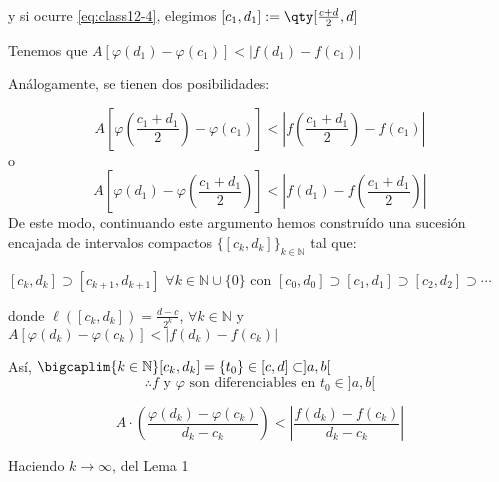 {y si ocurre \eqref{eq:class12-4}, elegimos $[c_1,d_1]:=\qty[\frac{c+d}{2},d]$

Tenemos que $A[\varphi(d_1)- \varphi(c_1)] < |f(d_1)-f(c_1)|$

Análogamente, se tienen dos posibilidades:

\begin{equation}
	A[\varphi(\frac{c_1+d_1}{2})-\varphi(c_1)] < |f(\frac{c_1+d_1}{2})-f(c_1)| 
		\label{eq:class12-5}
	\end{equation}
o
\begin{equation}
	A[\varphi(d_1)-\varphi(\frac{c_1+d_1}{2})] < |f(d_1)-f(\frac{c_1+d_1}{2})|
	\label{eq:class12-6}
\end{equation}
De este modo, continuando este argumento hemos construído una sucesión encajada de intervalos compactos
$\{[c_k,d_k]\}_{k\in\mathbb{N}}$ tal que:

$[c_k,d_k]\supset[c_{k+1},d_{k+1}]$ $\forall k\in\mathbb{N}\cup \{0\}$ con
$[c_0,d_0]\supset[c_1,d_1]\supset[c_2,d_2]\supset\cdots$ 

donde $\ell([c_k,d_k])=\frac{d-c}{2^k}$, $\forall k\in\mathbb{N}$
y $A[\varphi(d_k)-\varphi(c_k)]<|f(d_k)-f(c_k)|$

Así, $\bigcaplim{k\in\mathbb{N}}[c_k,d_k]=\{t_0\}\in[c,d] \subset ]a, b[$
$$
\therefore f \text{ y } \varphi \text{ son diferenciables en }   t_0\in]a,b[
$$

}


 
 
	
	

	
	$$
	A\cdot\left(\frac{\varphi(d_k)-\varphi(c_k)}{d_k-c_k}\right)<\left|\frac{f(d_k)-f(c_k)}{d_k-c_k}\right|
	$$
	
	Haciendo $k\to\infty$, del Lema 1
	
